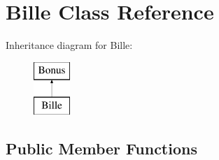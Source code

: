 \hypertarget{class_bille}{}\section{Bille Class Reference}
\label{class_bille}
Inheritance diagram for Bille\+:\begin{figure}[H]
\begin{center}
\leavevmode
\includegraphics[height=2.000000cm]{class_bille}
\end{center}
\end{figure}
\subsection*{Public Member Functions}
